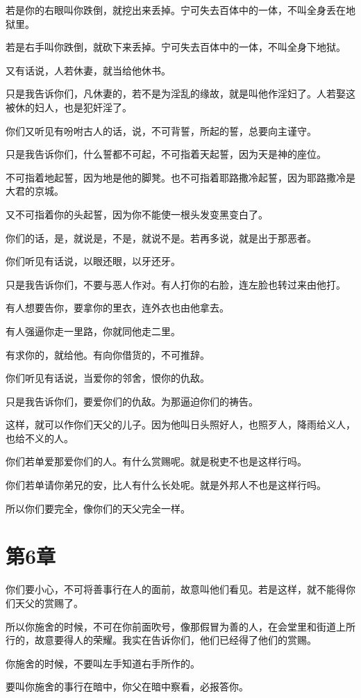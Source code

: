 \documentclass[12pt,oneside]{book}
\begin{document}
若是你的右眼叫你跌倒，就挖出来丢掉。宁可失去百体中的一体，不叫全身丢在地狱里。

若是右手叫你跌倒，就砍下来丢掉。宁可失去百体中的一体，不叫全身下地狱。

又有话说，人若休妻，就当给他休书。

只是我告诉你们，凡休妻的，若不是为淫乱的缘故，就是叫他作淫妇了。人若娶这被休的妇人，也是犯奸淫了。

你们又听见有吩咐古人的话，说，不可背誓，所起的誓，总要向主谨守。

只是我告诉你们，什么誓都不可起，不可指着天起誓，因为天是神的座位。

不可指着地起誓，因为地是他的脚凳。也不可指着耶路撒冷起誓，因为耶路撒冷是大君的京城。

又不可指着你的头起誓，因为你不能使一根头发变黑变白了。

你们的话，是，就说是，不是，就说不是。若再多说，就是出于那恶者。

你们听见有话说，以眼还眼，以牙还牙。

只是我告诉你们，不要与恶人作对。有人打你的右脸，连左脸也转过来由他打。

有人想要告你，要拿你的里衣，连外衣也由他拿去。

有人强逼你走一里路，你就同他走二里。

有求你的，就给他。有向你借货的，不可推辞。

你们听见有话说，当爱你的邻舍，恨你的仇敌。

只是我告诉你们，要爱你们的仇敌。为那逼迫你们的祷告。

这样，就可以作你们天父的儿子。因为他叫日头照好人，也照歹人，降雨给义人，也给不义的人。

你们若单爱那爱你们的人。有什么赏赐呢。就是税吏不也是这样行吗。

你们若单请你弟兄的安，比人有什么长处呢。就是外邦人不也是这样行吗。

所以你们要完全，像你们的天父完全一样。

\chapter{第6章}
你们要小心，不可将善事行在人的面前，故意叫他们看见。若是这样，就不能得你们天父的赏赐了。

所以你施舍的时候，不可在你前面吹号，像那假冒为善的人，在会堂里和街道上所行的，故意要得人的荣耀。我实在告诉你们，他们已经得了他们的赏赐。

你施舍的时候，不要叫左手知道右手所作的。

要叫你施舍的事行在暗中，你父在暗中察看，必报答你。
\end{document}
